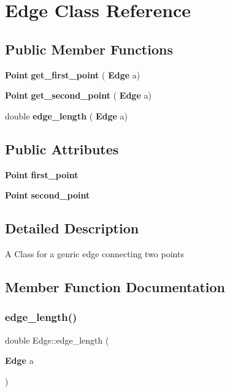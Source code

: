 \section{Edge Class Reference}
\label{class_edge}
\subsection*{Public Member Functions}
\begin{DoxyCompactItemize}
\item 
\textbf{ Point} \textbf{ get\+\_\+first\+\_\+point} (\textbf{ Edge} a)
\item 
\textbf{ Point} \textbf{ get\+\_\+second\+\_\+point} (\textbf{ Edge} a)
\item 
double \textbf{ edge\+\_\+length} (\textbf{ Edge} a)
\end{DoxyCompactItemize}
\subsection*{Public Attributes}
\begin{DoxyCompactItemize}
\item 
\textbf{ Point} \textbf{ first\+\_\+point}
\item 
\textbf{ Point} \textbf{ second\+\_\+point}
\end{DoxyCompactItemize}


\subsection{Detailed Description}
A Class for a genric edge connecting two points 

\subsection{Member Function Documentation}
\mbox{\label{class_edge_af672d6d2fb96be6d80ad4e7a32ae92b2}} 
\subsubsection{edge\+\_\+length()}
{\footnotesize\ttfamily double Edge\+::edge\+\_\+length (\begin{DoxyParamCaption}\item[{\textbf{ Edge}}]{a }\end{DoxyParamCaption})\hspace{0.3cm}{\ttfamily [inline]}}


